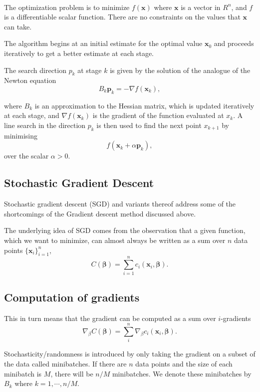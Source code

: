 \documentclass[%
oneside,                 %
final,                   %
10pt]{article}
\begin{document}
\paragraph{}
The optimization problem is to minimize $f(\mathbf {x} )$ where $\mathbf {x}$  is a vector in $R^{n}$, and $f$ is a differentiable scalar function. There are no constraints on the values that  $\mathbf {x}$  can take.

The algorithm begins at an initial estimate for the optimal value $\mathbf {x}_{0}$ and proceeds iteratively to get a better estimate at each stage.

The search direction $p_k$ at stage $k$ is given by the solution of the analogue of the Newton equation
\[
B_{k}\mathbf {p} _{k}=-\nabla f(\mathbf {x}_{k}),
\]

where $B_{k}$ is an approximation to the Hessian matrix, which is
updated iteratively at each stage, and $\nabla f(\mathbf {x} _{k})$
is the gradient of the function
evaluated at $x_k$. 
A line search in the direction $p_k$ is then used to
find the next point $x_{k+1}$ by minimising 
\[
f(\mathbf {x}_{k}+\alpha \mathbf {p}_{k}),
\]
over the scalar $\alpha > 0$.



\subsection*{Stochastic Gradient Descent}

Stochastic gradient descent (SGD) and variants thereof address some of
the shortcomings of the Gradient descent method discussed above.

The underlying idea of SGD comes from the observation that a given 
function, which we want to minimize, can almost always be written as a
sum over $n$ data points $\{\mathbf{x}_i\}_{i=1}^n$,
\[
C(\mathbf{\beta}) = \sum_{i=1}^n c_i(\mathbf{x}_i,
\mathbf{\beta}). 
\]

\subsection*{Computation of gradients}

This in turn means that the gradient can be
computed as a sum over $i$-gradients 
\[
\nabla_\beta C(\mathbf{\beta}) = \sum_i^n \nabla_\beta c_i(\mathbf{x}_i,
\mathbf{\beta}).
\]

Stochasticity/randomness is introduced by only taking the
gradient on a subset of the data called minibatches.  If there are $n$
data points and the size of each minibatch is $M$, there will be $n/M$
minibatches. We denote these minibatches by $B_k$ where
$k=1,\cdots,n/M$.
\end{document}

